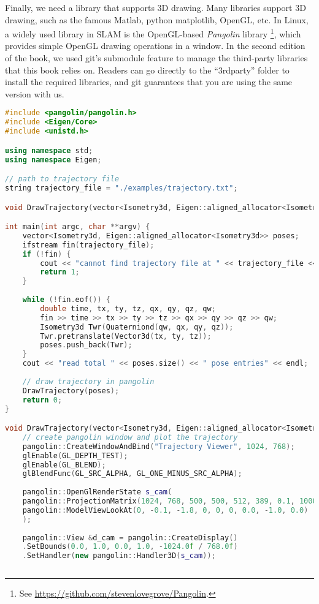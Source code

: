 Finally, we need a library that supports 3D drawing. Many libraries support 3D drawing, such as the famous Matlab, python matplotlib, OpenGL, etc. In Linux, a widely used library in SLAM is the OpenGL-based \textit{Pangolin} library \footnote{See \url {https://github.com/stevenlovegrove/Pangolin}.}, which provides simple OpenGL drawing operations in a window. In the second edition of the book, we used git's submodule feature to manage the third-party libraries that this book relies on. Readers can go directly to the ``3rdparty'' folder to install the required libraries, and git guarantees that you are using the same version with us.

\begin{lstlisting}[language=c++,caption=slambook2/ch3/examples/plotTrajectory.cpp]
#include <pangolin/pangolin.h>
#include <Eigen/Core>
#include <unistd.h>

using namespace std;
using namespace Eigen;

// path to trajectory file
string trajectory_file = "./examples/trajectory.txt";

void DrawTrajectory(vector<Isometry3d, Eigen::aligned_allocator<Isometry3d>>);

int main(int argc, char **argv) {
	vector<Isometry3d, Eigen::aligned_allocator<Isometry3d>> poses;
	ifstream fin(trajectory_file);
	if (!fin) {
		cout << "cannot find trajectory file at " << trajectory_file << endl;
		return 1;
	}
	
	while (!fin.eof()) {
		double time, tx, ty, tz, qx, qy, qz, qw;
		fin >> time >> tx >> ty >> tz >> qx >> qy >> qz >> qw;
		Isometry3d Twr(Quaterniond(qw, qx, qy, qz));
		Twr.pretranslate(Vector3d(tx, ty, tz));
		poses.push_back(Twr);
	}
	cout << "read total " << poses.size() << " pose entries" << endl;
	
	// draw trajectory in pangolin
	DrawTrajectory(poses);
	return 0;
}

void DrawTrajectory(vector<Isometry3d, Eigen::aligned_allocator<Isometry3d>> poses) {
	// create pangolin window and plot the trajectory
	pangolin::CreateWindowAndBind("Trajectory Viewer", 1024, 768);
	glEnable(GL_DEPTH_TEST);
	glEnable(GL_BLEND);
	glBlendFunc(GL_SRC_ALPHA, GL_ONE_MINUS_SRC_ALPHA);
	
	pangolin::OpenGlRenderState s_cam(
	pangolin::ProjectionMatrix(1024, 768, 500, 500, 512, 389, 0.1, 1000),
	pangolin::ModelViewLookAt(0, -0.1, -1.8, 0, 0, 0, 0.0, -1.0, 0.0)
	);
	
	pangolin::View &d_cam = pangolin::CreateDisplay()
	.SetBounds(0.0, 1.0, 0.0, 1.0, -1024.0f / 768.0f)
	.SetHandler(new pangolin::Handler3D(s_cam));
	

\end{lstlisting}
